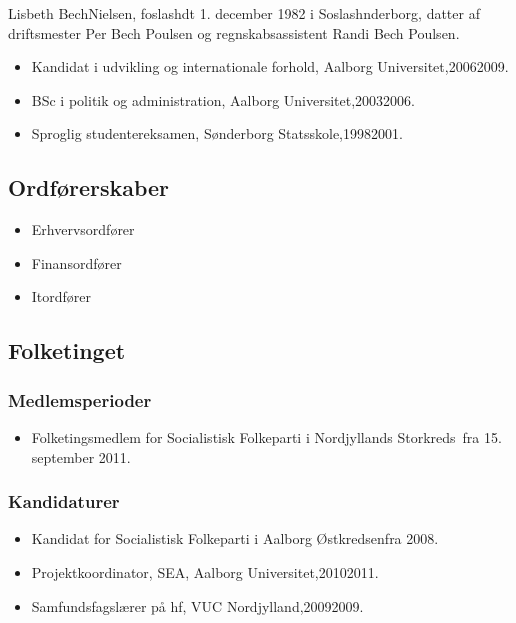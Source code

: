 \documentclass[11pt, a4paper]{awesome-cv}
\begin{document}
\makecvheader[R]
\makelettertitle
\begin{cvletter}
Lisbeth BechNielsen, foslashdt 1. december 1982 i Soslashnderborg, datter af driftsmester Per Bech Poulsen og regnskabsassistent Randi Bech Poulsen.

\begin{itemize}
\item Kandidat i udvikling og internationale forhold, Aalborg Universitet,20062009.
\item BSc i politik og administration, Aalborg Universitet,20032006.
\item Sproglig studentereksamen, Sønderborg Statsskole,19982001.
\end{itemize}
\subsection*{Ordførerskaber}
\begin{itemize}
\item Erhvervsordfører
\item Finansordfører
\item Itordfører
\end{itemize}
\subsection*{Folketinget}
\subsubsection*{Medlemsperioder}
\begin{itemize}
\item Folketingsmedlem for Socialistisk Folkeparti i Nordjyllands Storkreds fra 15. september 2011.
\end{itemize}
\subsubsection*{Kandidaturer}
\begin{itemize}
\item Kandidat for Socialistisk Folkeparti i Aalborg Østkredsenfra 2008.
\end{itemize}
\begin{itemize}
\item Projektkoordinator, SEA, Aalborg Universitet,20102011.
\item Samfundsfagslærer på hf, VUC Nordjylland,20092009.
\end{itemize}
\end{cvletter}
\end{document}
